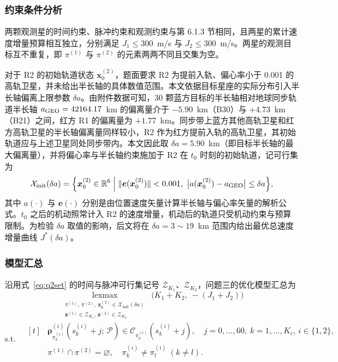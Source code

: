 \subsubsection{约束条件分析}

两颗观测星的时间约束、脉冲约束和观测约束与第 6.1.3 节相同，且两星的累计速度增量预算相互独立，分别满足 $J_1 \le 300$~m/s 与 $J_2 \le 300$~m/s。两星的观测目标互不重复，即 $\pi^{(1)}$ 与 $\pi^{(2)}$ 的元素两两不同且交集为空。

对于 R2 的初始轨道状态 $\bm x_0^{(2)}$，题面要求 R2 为提前入轨、偏心率小于 0.001 的高轨卫星，并未给出半长轴的具体数值范围。本文依据目标星座的实际分布引入半长轴偏离上限参数 $\delta a$。由附件数据可知，30 颗蓝方目标的半长轴相对地球同步轨道半长轴 $a_{\mathrm{GEO}} = 42164.17$~km 的偏离量介于 $-5.90$~km（B30）与 $+4.73$~km（B21）之间，红方 R1 的偏离量为 $+1.77$~km。同步带上蓝方其他高轨卫星和红方高轨卫星的半长轴偏离量同样较小，R2 作为红方提前入轨的高轨卫星，其初始轨道应与上述卫星同处同步带内。本文因此取 $\delta a = 5.90$~km（即目标半长轴的最大偏离量），并将偏心率与半长轴约束施加于 R2 在 $t_0$ 时刻的初始轨道，记可行集为
\begin{equation}
  \mathcal X_{\mathrm{init}}(\delta a) = \Big\{\bm x_0^{(2)} \in \mathbb R^6 \;\Big|\; \|\bm e(\bm x_0^{(2)})\| < 0.001,\ \big|a(\bm x_0^{(2)}) - a_{\mathrm{GEO}}\big| \le \delta a \Big\} ,
  \label{eq:q3init}
\end{equation}
其中 $a(\cdot)$ 与 $\bm e(\cdot)$ 分别是由位置速度矢量计算半长轴与偏心率矢量的解析公式。$t_0$ 之后的机动照常计入 R2 的速度增量，机动后的轨道只受机动约束与预算限制。为检验 $\delta a$ 取值的影响，后文将在 $\delta a = 3 \sim 19$~km 范围内给出最优总速度增量曲线 $J^*(\delta a)$。

\subsubsection{模型汇总}

沿用式~\eqref{eq:q2set} 的时间与脉冲可行集记号 $\mathcal Z_{K_1}$、$\mathcal Z_{K_2}$，问题三的优化模型汇总为
\begin{equation}
  \operatorname*{lexmax}_{\substack{\pi^{(1)},\,\pi^{(2)},\,\bm x_0^{(2)}\in\mathcal X_{\mathrm{init}}(\delta a)\\ \bm z^{(1)}\in\mathcal Z_{K_1},\,\bm z^{(2)}\in\mathcal Z_{K_2}}}\ \big(K_1 + K_2,\ -(J_1 + J_2)\big)
  \label{eq:q3model}
\end{equation}
\begin{equation*}
  \text{s.t.}\quad
  \begin{aligned}[t]
    & \bm\rho^{(i)}_{\pi^{(i)}_k}(s^{(i)}_k + j;\,\mathcal P) \in \mathcal C_{\pi^{(i)}_k}(s^{(i)}_k + j),\quad j = 0,\dots,60,\ k = 1,\dots,K_i,\ i \in \{1, 2\}, \\
    & \pi^{(1)} \cap \pi^{(2)} = \varnothing,\quad \pi^{(i)}_k \ne \pi^{(i)}_l\ (k \ne l) .
  \end{aligned}
\end{equation*}

